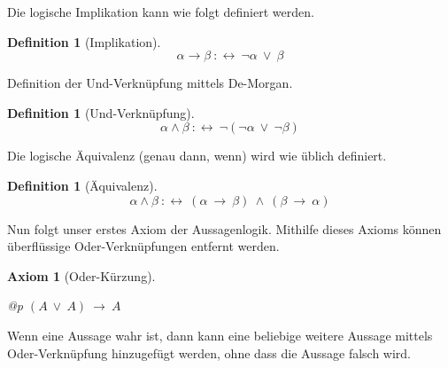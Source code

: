 \documentclass[a4paper,german,10pt,twoside]{book}
\newtheorem{ax}{Axiom}
\theoremstyle{definition}
\newtheorem{defn}[thm]{Definition}
\theoremstyle{remark}
\begin{document}
\par
Die logische Implikation kann wie folgt definiert werden.

\begin{defn}[Implikation]
\label{definition:implication} \hypertarget{definition:implication}{}
$$\alpha \rightarrow \beta\ :\leftrightarrow \ \neg \alpha\ \lor \ \beta$$

\end{defn}




\par
Definition der Und-Verkn{\"u}pfung mittels De-Morgan.

\begin{defn}[Und-Verkn{\"u}pfung]
\label{definition:conjunction} \hypertarget{definition:conjunction}{}
$$\alpha \land \beta\ :\leftrightarrow \ \neg (\neg \alpha\ \lor \ \neg \beta)$$

\end{defn}




\par
Die logische {\"A}quivalenz ({\glqq genau dann, wenn\grqq}) wird wie 
{\"u}blich definiert.

\begin{defn}[{\"A}quivalenz]
\label{definition:equivalence} \hypertarget{definition:equivalence}{}
$$\alpha \land \beta\ :\leftrightarrow \ (\alpha\ \rightarrow \ \beta)\ \land \ (\beta\ \rightarrow \ \alpha)$$

\end{defn}




\par
Nun folgt unser erstes Axiom der Aussagenlogik. Mithilfe dieses 
Axioms k{\"o}nnen {\"u}berfl{\"u}ssige Oder-Verkn{\"u}pfungen entfernt werden.

\begin{ax}[Oder-K{\"u}rzung]
\label{axiom:disjunction_idempotence} \hypertarget{axiom:disjunction_idempotence}{}
\mbox{}
\begin{longtable}{{@{\extracolsep{\fill}}p{\linewidth}}}
\centering $(A\ \lor \ A)\ \rightarrow \ A$
\end{longtable}

\end{ax}




\par
Wenn eine Aussage wahr ist, dann kann eine beliebige weitere Aussage mittels Oder-Verkn{\"u}pfung hinzugef{\"u}gt werden, ohne dass die Aussage falsch wird.
\end{document}
